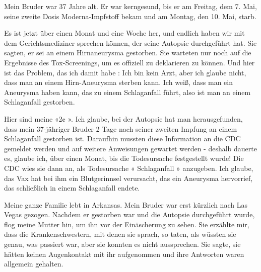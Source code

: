 

Mein Bruder war 37 Jahre alt. Er war kerngesund, bis er am Freitag, dem 7. Mai, seine zweite Dosis Moderna-Impfstoff bekam und am Montag, den 10. Mai, starb.

Es ist jetzt über einen Monat und eine Woche her, und endlich haben wir mit dem Gerichtsmediziner sprechen können, der seine Autopsie durchgeführt hat. Sie sagten, er sei an einem Hirnaneurysma gestorben. Sie warteten nur noch auf die Ergebnisse des Tox-Screenings, um es offiziell zu deklarieren zu können. Und hier ist das Problem, das ich damit habe : Ich bin kein Arzt, aber ich glaube nicht, dass man an einem Hirn-Aneurysma sterben kann. Ich weiß, dass man ein Aneurysma haben kann, das zu einem Schlaganfall führt, also ist man an einem Schlaganfall gestorben.

Hier sind meine «2¢ ». Ich glaube, bei der Autopsie hat man herausgefunden, dass mein 37-jähriger Bruder 2 Tage nach seiner zweiten Impfung an einem Schlaganfall gestorben ist. Daraufhin mussten diese Information an die CDC gemeldet werden und auf weitere Anweisungen gewartet werden - deshalb dauerte es, glaube ich, über einen Monat, bis die Todesursache festgestellt wurde! Die CDC wies sie dann an, als Todesursache « Schlaganfall » anzugeben. Ich glaube, das Vax hat bei ihm ein Blutgerinnsel verursacht, das ein Aneurysma hervorrief, das schließlich in einem Schlaganfall endete.

Meine ganze Familie lebt in Arkansas. Mein Bruder war erst kürzlich nach Las Vegas gezogen. Nachdem er gestorben war und die Autopsie durchgeführt wurde, flog meine Mutter hin, um ihn vor der Einäscherung zu sehen. Sie erzählte mir, dass die Krankenschwestern, mit denen sie sprach, so taten, als wüssten sie genau, was passiert war, aber sie konnten es nicht aussprechen. Sie sagte, sie hätten keinen Augenkontakt mit ihr aufgenommen und ihre Antworten waren allgemein gehalten.
